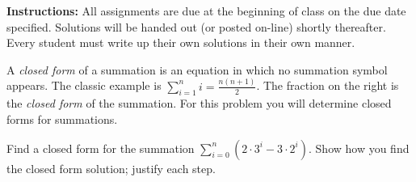 \documentclass[11pt]{exam}
\begin{document}
\extrawidth{0.5in}%
\pagestyle{headandfoot}%
 \headrule
  \footrule {}

\addpoints

\noindent \textbf{Instructions:} All assignments are due at the
beginning of class on the due date specified.  Solutions will be
handed out (or posted on-line) shortly thereafter.  Every student
must write up their own solutions in their own manner.

\begin{questions}
\printanswers

\question A \textit{closed form} of a summation is an equation
in which no summation symbol appears.  The classic example is
$\displaystyle \sum_{i=1}^n i = \frac{n(n+1)}{2}$.  The fraction on
the right is the \textit{closed form} of the summation.  For this
problem you will determine closed forms for summations. %
%

Find a closed form for the summation $\displaystyle \sum_{i=0}^n (2 \cdot 3^i - 3 \cdot 2^i)$.  Show how you find the closed form solution; justify each step.


\end{questions}
\end{document}
